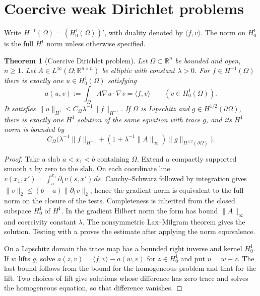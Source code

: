 \documentclass[11pt,oneside,openany]{book}
\theoremstyle{plain}
\newtheorem{theorem}{Theorem}[chapter]
\theoremstyle{definition}
\theoremstyle{remark}
\begin{document}
\section{Coercive weak Dirichlet problems}\label{pde:E01}

Write \(H^{-1}(\Omega)=(H_0^1(\Omega))'\), with duality denoted by
\(\langle f,v\rangle\). The norm on \(H_0^1\) is the full \(H^1\) norm
unless otherwise specified.

\begin{theorem}[Coercive Dirichlet problem]\label{pde:elliptic-weak-dirichlet}
Let \(\Omega\subset\mathbb R^n\) be bounded and open, \(n\geq1\).
Let \(A\in L^\infty(\Omega;\mathbb R^{n\times n})\) be elliptic
with constant \(\lambda>0\). For \(f\in H^{-1}(\Omega)\) there is
exactly one \(u\in H_0^1(\Omega)\) satisfying
\[
 a(u,v):=\int_\Omega A\nabla u\cdot\nabla v
       =\langle f,v\rangle \qquad(v\in H_0^1(\Omega)).
\]
It satisfies \(\|u\|_{H^1}\leq C_\Omega\lambda^{-1}
\|f\|_{H^{-1}}\). If \(\Omega\) is Lipschitz and
\(g\in H^{1/2}(\partial\Omega)\), there is exactly one \(H^1\)
solution of the same equation with trace \(g\), and its \(H^1\)
norm is bounded by
\[
 C_\Omega\bigl(\lambda^{-1}\|f\|_{H^{-1}}+
 (1+\lambda^{-1}\|A\|_\infty)\|g\|_{H^{1/2}(\partial\Omega)}\bigr).
\]
\end{theorem}

\begin{proof}
Take a slab \(a<x_1<b\) containing \(\Omega\). Extend a compactly
supported smooth \(v\) by zero to the slab. On each coordinate line
\(v(x_1,x')=\int_a^{x_1}\partial_1v(s,x')\,ds\).
Cauchy--Schwarz followed by integration gives
\(\|v\|_2\leq(b-a)\|\partial_1v\|_2\), hence the gradient norm is
equivalent to the full norm on the closure of the tests.
Completeness is inherited from the closed subspace \(H_0^1\) of
\(H^1\). In the gradient Hilbert norm the form has bound
\(\|A\|_\infty\) and coercivity constant \(\lambda\).
The nonsymmetric Lax--Milgram theorem gives the solution. Testing
with \(u\) proves the estimate after applying the norm equivalence.

On a Lipschitz domain the trace map has a bounded right inverse and
kernel \(H_0^1\). If \(w\) lifts \(g\), solve
\(a(z,v)=\langle f,v\rangle-a(w,v)\) for \(z\in H_0^1\) and put
\(u=w+z\). The last bound follows from the bound for the homogeneous
problem and that for the lift. Two choices of lift give solutions
whose difference has zero trace and solves the homogeneous equation,
so that difference vanishes.
\end{proof}
\end{document}
